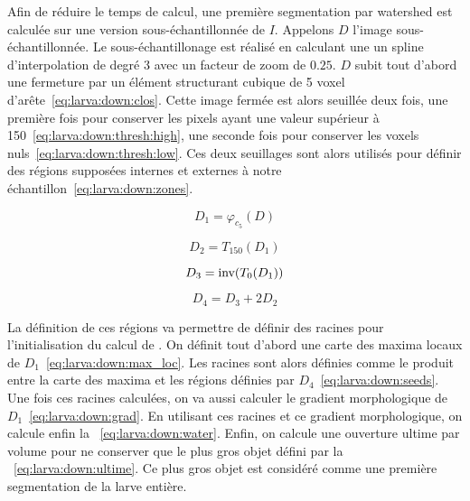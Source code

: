 \documentclass[\main/main.tex]{subfiles}
\begin{document}
%
Afin de réduire le temps de calcul, une première segmentation par watershed est calculée sur une version sous\hyp{}échantillonnée de $I$.
%
Appelons $D$ l'image sous\hyp{}échantillonnée.
%
Le sous-échantillonage est réalisé en calculant une un spline d'interpolation de degré 3 avec un facteur de zoom de $0.25$.
%
$D$ subit tout d'abord une fermeture par un élément structurant cubique de 5 voxel d'arête~\eqref{eq:larva:down:clos}.
%
Cette image fermée est alors seuillée deux fois, une première fois pour conserver les pixels ayant une valeur supérieur à 150~\eqref{eq:larva:down:thresh:high}, une seconde fois pour conserver les voxels nuls~\eqref{eq:larva:down:thresh:low}.
%
Ces deux seuillages sont alors utilisés pour définir des régions supposées internes et externes à notre échantillon~\eqref{eq:larva:down:zones}.

\begin{equation}
    \label{eq:larva:down:clos}
    D_1 = \varphi_{c_{5}}(D)
\end{equation}

\begin{equation}
    \label{eq:larva:down:thresh:high}
    D_2 = T_{150}(D_{1})
\end{equation}

\begin{equation}
    \label{eq:larva:down:thresh:low}
    D_3 = \operatorname{\textnormal{inv}}(T_{0}(D_{1}))
\end{equation}

\begin{equation}
    \label{eq:larva:down:zones}
    D_{4} = D_3 + 2D_{2} 
\end{equation}

%
La définition de ces régions va permettre de définir des racines pour l'initialisation du calcul de \watershed{}.
%
On définit tout d'abord une carte des maxima locaux de $D_1$~\eqref{eq:larva:down:max_loc}.
%
Les racines sont alors définies comme le produit entre la carte des maxima et les régions définies par $D_{4}$~\eqref{eq:larva:down:seeds}.
%
Une fois ces racines calculées, on va aussi calculer le gradient morphologique de $D_1$~\eqref{eq:larva:down:grad}.
%
En utilisant ces racines et ce gradient morphologique, on calcule enfin la \watershed{}~\eqref{eq:larva:down:water}.
%
Enfin, on calcule une ouverture ultime par volume pour ne conserver que le plus gros objet défini par la \watershed{}~\eqref{eq:larva:down:ultime}.
%
Ce plus gros objet est considéré comme une première segmentation de la larve entière.
\end{document}
